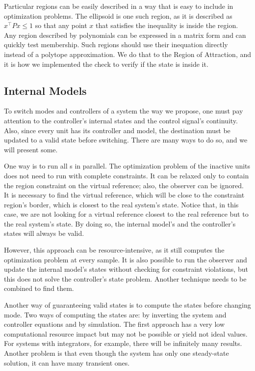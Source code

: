 Particular regions can be easily described in a way that is easy to include in
optimization problems. The ellipsoid is one such region, as it is described as
\(x^{\top}Px\leq{}1\) so that any point \(x\) that satisfies the inequality is inside
the region. Any region described by polynomials can be expressed in a matrix
form and can quickly test membership. Such regions should use their inequation
directly instead of a polytope approximation. We do that to the Region of
Attraction, and it is how we implemented the check to verify if the state is
inside it.

\subsection{Internal Models}%
\label{subsec:internal-models}

To switch modes and controllers of a system the way we propose, one must pay
attention to the controller's internal states and the control signal's
continuity. Also, since every \CG{} unit has its controller and model, the
destination \CG{} must be updated to a valid state before switching. There are
many ways to do so, and we will present some.

One way is to run all \CG{}s in parallel. The optimization problem of the
inactive units does not need to run with complete constraints. It can be relaxed
only to contain the region constraint on the virtual reference; also, the
observer can be ignored. It is necessary to find the virtual reference, which
will be close to the constraint region's border, which is closest to the real
system's state. Notice that, in this case, we are not looking for a virtual
reference closest to the real reference but to the real system's state. By doing
so, the internal model's and the controller's states will always be valid.

However, this approach can be resource-intensive, as it still computes the
optimization problem at every sample. It is also possible to run the observer
and update the internal model's states without checking for constraint
violations, but this does not solve the controller's state problem. Another
technique needs to be combined to find them.

Another way of guaranteeing valid states is to compute the states before
changing mode. Two ways of computing the states are: by inverting the system and
controller equations and by simulation. The first approach has a very low
computational resource impact but may not be possible or yield not ideal values.
For systems with integrators, for example, there will be infinitely many
results. Another problem is that even though the system has only one
steady-state solution, it can have many transient ones.

